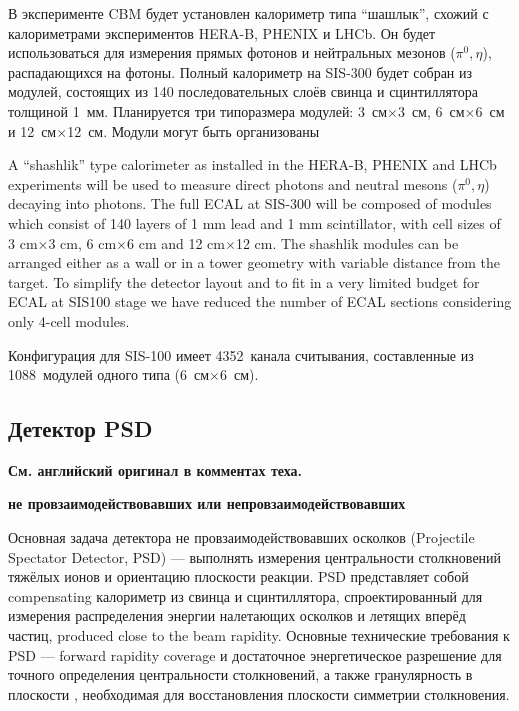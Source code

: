 В эксперименте CBM будет установлен калориметр типа ``шашлык'', схожий с калориметрами экспериментов HERA-B, PHENIX и LHCb. Он будет использоваться для измерения прямых фотонов и нейтральных мезонов ($ \pi^{0}, \eta $), распадающихся на фотоны. Полный калориметр на SIS-300 будет собран из модулей, состоящих из 140 последовательных слоёв свинца и сцинтиллятора толщиной 1~мм. Планируется три типоразмера модулей: 3~см$\times$3~см, 6~см$\times$6~см и 12~см$\times$12~см. Модули могут быть организованы

A ``shashlik'' type calorimeter as installed in the HERA-B, PHENIX and LHCb experiments will
be used to measure direct photons and neutral mesons ($ \pi^{0}, \eta $) decaying into photons. The full
ECAL at SIS-300 will be composed of modules which consist of 140 layers of 1 mm lead and
1 mm scintillator, with cell sizes of 3 cm$\times$3 cm, 6 cm$\times$6 cm and 12 cm$\times$12 cm. The shashlik
modules can be arranged either as a wall or in a tower geometry with variable distance from the
target.
To simplify the detector layout and to fit in a very limited budget for ECAL at SIS100 stage we
have reduced the number of ECAL sections considering only 4-cell modules.

Конфигурация для SIS-100 имеет 4352~канала считывания, составленные из 1088~модулей одного типа (6~см$\times$6~см). 



\subsection{Детектор PSD}\label{sec:secPSD}

\textbf{См. английский оригинал в комментах теха.}

\todo \textbf{не провзаимодействовавших или непровзаимодействовавших} \todo

Основная задача детектора не провзаимодействовавших осколков (Projectile Spectator Detector, PSD) --- выполнять измерения центральности столкновений тяжёлых ионов и ориентацию плоскости реакции. PSD представляет собой compensating \todo калориметр из свинца и сцинтиллятора, спроектированный для измерения распределения энергии налетающих осколков и летящих вперёд частиц, produced close to the beam rapidity.
Основные технические требования к PSD --- forward rapidity coverage и достаточное энергетическое разрешение для точного определения центральности столкновений, а также гранулярность в плоскости \todo, необходимая для восстановления плоскости симметрии столкновения.

